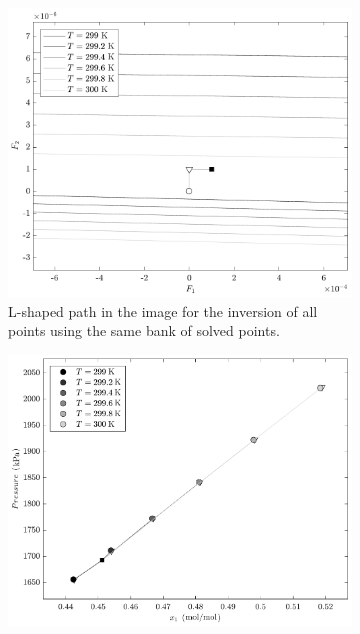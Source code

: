 \documentclass[journal=iecred,manuscript=article]{achemso}
\theoremstyle{definition}
\theoremstyle{remark}
\begin{document}
\begin{figure}[!hb]
\centering
\begin{subfigure}{.48\textwidth}
  \centering
  \includegraphics[width=\linewidth]{caminho_L_imagem_unico_banco.pdf}
  \caption{L-shaped path in the image for the inversion of all points using the same bank of solved points.}
  \label{fig:unique_bank_image}
\end{subfigure}\hfill
\begin{subfigure}{.48\textwidth}
  \centering
  \includegraphics[width=\linewidth]{caminhos_L_dominio_unico_banco1.pdf}

\end{subfigure}
\end{figure}
\end{document}

